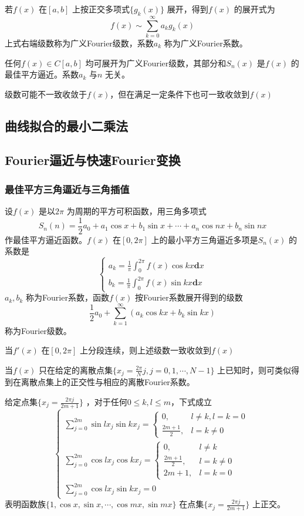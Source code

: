 \documentclass[a4paper]{article}
\begin{document}
若$f(x)$ 在$[a,b]$ 上按正交多项式$\{g_k(x)\} $ 展开，得到$f(x)$ 的展开式为
\[
f(x) \sim \sum_{k=0}^{\infty} a_k g_k(x)
\] 
上式右端级数称为广义Fourier级数，系数$a_k$ 称为广义Fourier系数。

任何$f(x) \in C[a,b]$ 均可展开为广义Fourier级数，其部分和$S_n(x)$ 是$f(x)$ 的最佳平方逼近。系数$a_k$ 与$n$ 无关。

级数可能不一致收敛于$f(x)$，但在满足一定条件下也可一致收敛到$f(x)$

\subsection{曲线拟合的最小二乘法}

\subsection{Fourier逼近与快速Fourier变换}
\subsubsection{最佳平方三角逼近与三角插值}
设$f(x)$ 是以$2 \pi$ 为周期的平方可积函数，用三角多项式
\[
S_n(n) = \frac{1}{2} a_0 + a_1 \cos x + b_1 \sin x + \cdots + a_n \cos nx + b_n \sin nx
\] 
作最佳平方逼近函数。$f(x)$ 在$[0,2\pi]$ 上的最小平方三角逼近多项是$S_n(x)$ 的系数是
\[
\begin{cases}
	a_k = \frac{1}{\pi} \int_{0}^{2 \pi} f(x) \cos kx \mathbf{d} x \\
	b_k = \frac{1}{\pi} \int_{0}^{2 \pi} f(x) \sin kx \mathbf{d} x 
\end{cases}
\] 
$a_k, b_k$ 称为Fourier系数，函数$f(x)$ 按Fourier系数展开得到的级数
\[
\frac{1}{2} a_0 + \sum_{k=1}^{\infty} (a_k \cos kx + b_k \sin kx)
\] 
称为Fourier级数。

当$f'(x)$ 在$[0,2 \pi]$ 上分段连续，则上述级数一致收敛到$f(x)$


当$f(x)$ 只在给定的离散点集$\{ x_{j} = \frac{2\pi}{N} j, j = 0,1,\cdots,N-1\} $ 上已知时，则可类似得到在离散点集上的正交性与相应的离散Fourier系数。

给定点集$\{x_{j} = \frac{2 \pi j}{2 m + 1}\} $ ，对于任何$0 \le k,l \le m$，下式成立
\[
\begin{cases}
	\sum_{j=0}^{2m} \sin l x_{j} \sin k x_{j} = \begin{cases}
		0, & l \neq k, l = k = 0 \\
		\frac{2m+1}{2}, & l = k \neq 0
	\end{cases} \\
	\sum_{j=0}^{2m} \cos l x_{j} \cos k x_{j} = \begin{cases}
		0, & l \neq k \\
		\frac{2m + 1}{2}, & l = k \neq 0 \\
		2m + 1, & l = k = 0
	\end{cases} \\
	\sum_{j=0}^{2m} \cos l x_{j} \sin k x_{j} = 0
\end{cases}
\] 
表明函数族$\{1, \cos x, \sin x, \cdots, \cos mx, \sin mx\} $ 在点集$\{ x_{j} = \frac{2 \pi j}{2 m + 1}\} $ 上正交。
\end{document}
